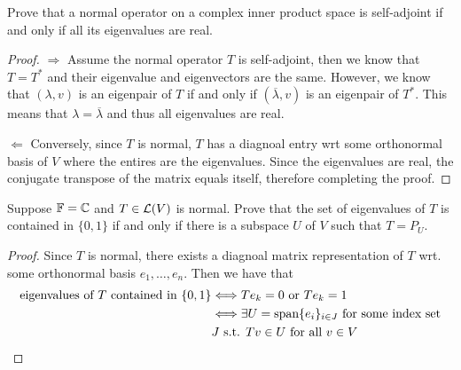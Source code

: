 \documentclass{extarticle}
\begin{document}

\newpage 
{}


\begin{problem}{1}
    Prove that a normal operator on a complex inner product space is self-adjoint if and only if 
    all its eigenvalues are real. 
\end{problem}

\begin{proof}
\(\Rightarrow\) Assume the normal operator \(T\) is self-adjoint, then we know that \(T = T^*\) and 
their eigenvalue and eigenvectors are the same. However, we know that \((\lambda, v)\) is an eigenpair 
of \(T\) if and only if \((\overline{\lambda}, v)\) is an eigenpair of \(T^*\). This means that 
\(\lambda = \overline{\lambda}\) and thus all eigenvalues are real. 

\(\Leftarrow\) Conversely, since \(T\) is normal, \(T\) has a diagnoal entry wrt some orthonormal 
basis of \(V\) where the entires are the eigenvalues. Since the eigenvalues are real, the conjugate transpose of 
the matrix equals itself, therefore completing the proof.
\end{proof}


\begin{problem}{3}
    Suppose \(\mathbb{F} = \mathbb{C}\) and \(T \in \mathcal{L}(V)\) is normal. Prove that the set of eigenvalues 
    of \(T\) is contained in \(\{0, 1\}\) if and only if there is a subspace \(U\) of \(V\) such 
    that \(T = P_U\). 
\end{problem}

\begin{proof}
Since \(T\) is normal, there exists a diagnoal matrix representation of \(T\) wrt. some orthonormal 
basis \(e_1, \ldots, e_n\). Then we have that 
\begin{align*}
    \text{eigenvalues of } T \text{ contained in } \{0, 1\} 
    &\Longleftrightarrow Te_k = 0 \text{ or } T e_k = 1 \\ 
    &\Longleftrightarrow \exists U = \text{span}\{e_i\}_{i \in J} \text{ for some index set}\\ 
    &J \text{ s.t. } Tv \in U \text{ for all } v \in V 
\end{align*}
\end{proof}
\end{document}
